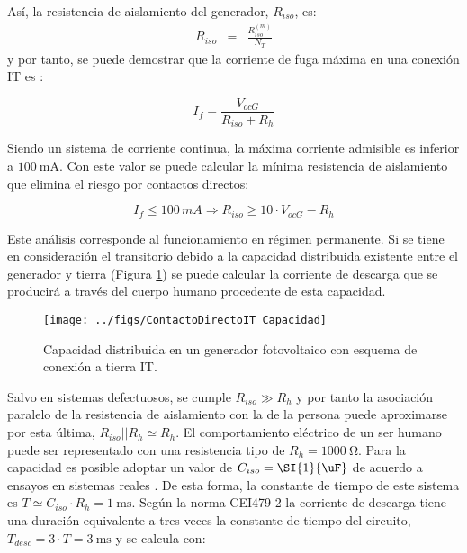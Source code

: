 Así, la resistencia de aislamiento del generador, $R_{iso}$, es:\begin{eqnarray}
R_{iso} & = & \frac{R_{iso}^{(m)}}{N_{T}}\label{eq:RisoIT}\end{eqnarray}
y por tanto, se puede demostrar que la corriente de fuga máxima en
una conexión IT es \cite{Gomez-Vidal2000}: 

\begin{equation}
I_{f}=\frac{V_{ocG}}{R_{iso}+R_{h}}\label{eq:If_IT}\end{equation}


Siendo un sistema de corriente continua, la máxima corriente admisible
es inferior a $\SI{100}{\milli\ampere}$. Con este valor se puede
calcular la mínima resistencia de aislamiento que elimina el riesgo
por contactos directos:

\begin{equation}
I_{f}\leq100\, mA\Longrightarrow R_{iso}\geq10\cdot V_{ocG}-R_{h}\label{eq:Riso_IT}\end{equation}


Este análisis corresponde al funcionamiento en régimen permanente.
Si se tiene en consideración el transitorio debido a la capacidad
distribuida existente entre el generador y tierra (Figura \ref{fig:CapacidadIT})
se puede calcular la corriente de descarga que se producirá a través
del cuerpo humano procedente de esta capacidad. 

%
\begin{figure}
\texttt{[image: ../figs/ContactoDirectoIT\_Capacidad]}

\caption{Capacidad distribuida en un generador fotovoltaico con esquema de
conexión a tierra IT.\label{fig:CapacidadIT}}

\end{figure}


Salvo en sistemas defectuosos, se cumple $R_{iso}\gg R_{h}$ y por
tanto la asociación paralelo de la resistencia de aislamiento con la de la
persona puede aproximarse por esta última, $R_{iso}||R_{h} \simeq R_h$. El comportamiento
eléctrico de un ser humano puede ser representado con una resistencia
tipo de $R_{h}=\SI{1000}{\ohm}$. Para la capacidad es posible adoptar
un valor de $C_{iso}=\SI{1}{\uF}$
de acuerdo a ensayos en sistemas reales \cite{Gomez-Vidal2000}.
De esta forma, la constante de tiempo de este sistema es $T\simeq C_{iso}\cdot R_{h}=\SI{1}{\milli\second}$.
Según la norma CEI479-2 la corriente de descarga tiene una duración
equivalente a tres veces la constante de tiempo del circuito, $T_{desc}=3\cdot T=\SI{3}{\milli\second}$
y se calcula con:

